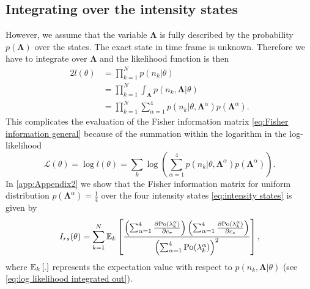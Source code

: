 \subsection{Integrating over the intensity states\label{sub:FI int out}}
%
However, we assume that the variable $\bm{\Lambda}$ is fully described by the probability $p(\bm{\Lambda})$ over the states. The exact state in time frame is unknown. Therefore we have to integrate over $\bm{\Lambda}$ and the likelihood function is then
%
\begin{alignat}{2}
	l(\theta)
	&=\prod_{k=1}^Np(n_k|\theta)\nonumber\\
	&=\prod_{k=1}^N\int_{\bm{\Lambda}}p(n_k,\bm{\Lambda}|\theta)\nonumber\\
	&=\prod_{k=1}^N\sum_{\alpha=1}^4p(n_k|\theta,\bm{\Lambda}^\alpha)p(\bm{\Lambda}^\alpha).
	\label{eq:FREM likelihood Lambda integrated out}
\end{alignat}
%
This complicates the evaluation of the Fisher information matrix \autoref{eq:Fisher information general} because of the summation within the logarithm in the log-likelihood
%
\begin{equation}
	\mathcal{L}(\theta)=\log l(\theta)=\sum_k\log\left(\sum_{\alpha=1}^4p(n_k|\theta,\bm{\Lambda}^\alpha)p(\bm{\Lambda}^\alpha)\right).
	\label{eq:log likelihood integrated out}
\end{equation}
%
In \autoref{app:Appendix2} we show that the Fisher information matrix for uniform distribution $p(\bm{\Lambda}^\alpha)=\frac{1}{4}$ over the four intensity states \autoref{eq:intensity states} is given by
%
\begin{equation}
	I_{rs}(\theta) =\sum_{k=1}^N\mathbb{E}_k\left[\frac{\left(\sum_{\alpha=1}^4\frac{\partial\mathrm{Po}(\lambda_k^\alpha)}{\partial c_r}\right)\left(\sum_{\alpha=1}^4\frac{\partial\mathrm{Po}(\lambda_k^\alpha)}{\partial c_s}\right)}{\left(\sum_{\alpha=1}^4\mathrm{Po}(\lambda_k^\alpha)\right)^2}\right],
	\label{eq:Fisher Information Blinking Integrating Out}
\end{equation}
%
where $\mathbb{E}_k\left[.\right]$ represents the expectation value with respect to $p(n_k,\bm{\Lambda}|\theta)$ (see \autoref{eq:log likelihood integrated out}). 

